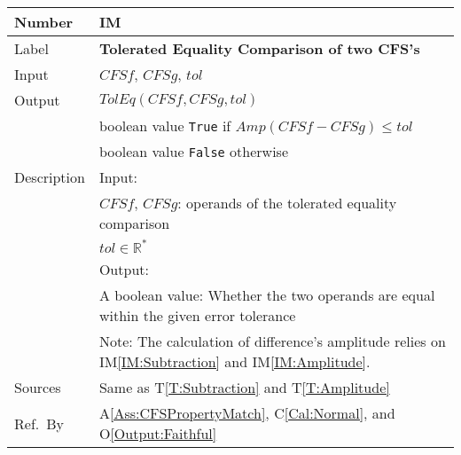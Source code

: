 \documentclass[12pt]{article}
\newcommand{\colAwidth}{0.13\textwidth}
\newcommand{\colBwidth}{0.82\textwidth}
\newcommand{\tref}[1]{T\ref{#1}}
\newcounter{instnum} %
\newcommand{\iref}[1]{IM\ref{#1}}
\newcommand{\aref}[1]{A\ref{#1}}
\newcommand{\calref}[1]{C\ref{#1}}
\newcommand{\oref}[1]{O\ref{#1}}
\begin{document}
\noindent
\begin{minipage}{\textwidth}
	\renewcommand*{\arraystretch}{1.5}
	\begin{tabular}{| p{\colAwidth} | p{\colBwidth}|}
		\hline
		\rowcolor[gray]{0.9}
		Number& IM{instnum}\theinstnum 
		\label{IM:ToleratedEquality}\\
		\hline
		Label& \bf Tolerated Equality Comparison of two CFS's \\
		\hline
		Input& $\mathit{CFSf}$, $\mathit{CFSg}$, $\mathit{tol}$\\
		\hline
		Output&$\mathit{TolEq}(\mathit{CFSf}, \mathit{CFSg}, \mathit{tol})$\\
		& boolean value \texttt{True} if 
		$\mathit{Amp}(\mathit{CFSf}-\mathit{CFSg})\leq \mathit{tol}$\\
		&boolean value \texttt{False} otherwise\\
		\hline
		Description&Input:\\
		&$\mathit{CFSf}$, $\mathit{CFSg}$: operands of 
		the tolerated equality comparison\\
		&$\mathit{tol}\in\mathbb{R}^{*}$\\
		&Output:\\
		& A boolean value: Whether the two operands are equal 
		within the given error tolerance\\
		&Note: The calculation of difference's amplitude 
		relies on \iref{IM:Subtraction} and \iref{IM:Amplitude}.\\
		\hline
		Sources&Same as \tref{T:Subtraction} and \tref{T:Amplitude}\\
		\hline
		Ref.\ By & \aref{Ass:CFSPropertyMatch}, \calref{Cal:Normal}, 
		and \oref{Output:Faithful}\\
		\hline
	\end{tabular}
\end{minipage}\\
~\newline
\end{document}
